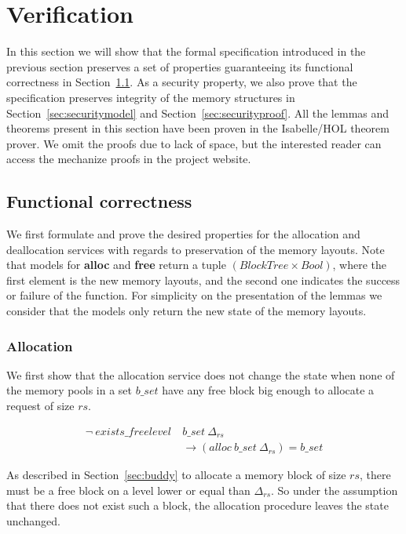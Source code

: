 \section{Verification}
In this section we will show that the formal specification introduced in the previous section preserves a set of properties guaranteeing its functional correctness in Section~\ref{sec:functional}. As a security property, we also prove that the specification preserves integrity of the memory structures in Section~\ref{sec:securitymodel} and Section~\ref{sec:securityproof}. All the lemmas and theorems present in this section have been proven in the Isabelle/HOL theorem prover. We omit the proofs due to lack of space, but the interested reader can access the mechanize proofs in the project website.

\subsection{Functional correctness}\label{sec:functional}
We first formulate and prove the desired properties for the allocation and deallocation services with regards to preservation of the memory layouts. Note that models for \textbf{alloc} and \textbf{free} return a tuple $(BlockTree \times Bool)$, where the first element is the new memory layouts, and the second one indicates the success or failure of the function. For simplicity on the presentation of the lemmas we consider that the models only return the new state of the memory layouts.

\subsubsection{Allocation}\label{sec:functionalalloc}
We first show that the allocation service does not change the state when none of the memory pools in a set $b\_set$ have any free block big enough to allocate a request of size $rs$. 

\begin{lemma} 
\label{lemma:no_free_space}
\begin{align*}
\neg\ exists\_freelevel\ &b\_set\ \Delta_{rs}\\
&\longrightarrow (alloc\ b\_set\ \Delta_{rs}) = b\_set
\end{align*}
\end{lemma}

As described in Section~\ref{sec:buddy} to allocate a memory block of size $rs$, there must be a free block on a level lower or equal than $\Delta_{rs}$. So under the assumption that there does not exist such a block, the allocation procedure leaves the state unchanged.

